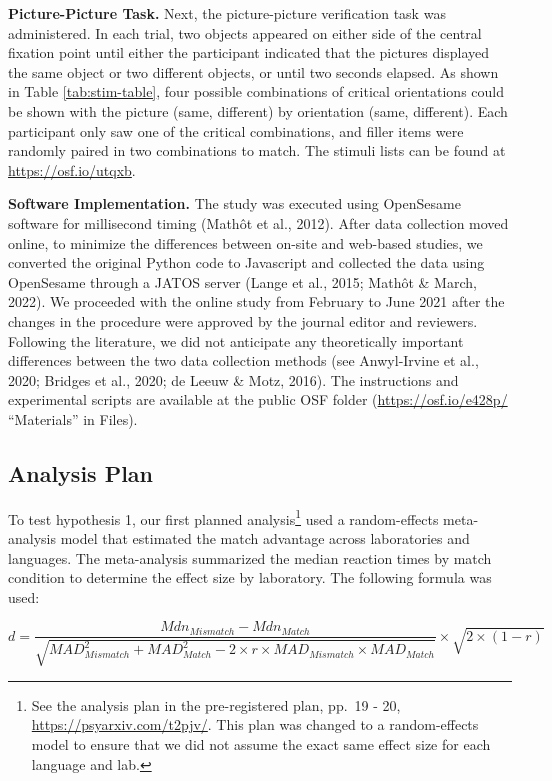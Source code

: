 \documentclass[
  man,floatsintext]{apa7}
\begin{document}
\textbf{Picture-Picture Task.} Next, the picture-picture verification task
was administered. In each trial, two objects appeared on either side of
the central fixation point until either the participant indicated that
the pictures displayed the same object or two different objects, or
until two seconds elapsed. As shown in Table \ref{tab:stim-table}, four
possible combinations of critical orientations could be shown with the
picture (same, different) by orientation (same, different). Each
participant only saw one of the critical combinations, and filler items
were randomly paired in two combinations to match. The stimuli lists can
be found at \url{https://osf.io/utqxb}.

\textbf{Software Implementation.} The study was executed using OpenSesame
software for millisecond timing
(Mathôt et al., 2012). After data collection moved
online, to minimize the differences between on-site and web-based
studies, we converted the original Python code to Javascript and
collected the data using OpenSesame through a JATOS server
(Lange et al., 2015; Mathôt \& March, 2022). We proceeded with
the online study from February to June 2021 after the changes in the
procedure were approved by the journal editor and reviewers. Following
the literature, we did not anticipate any theoretically important
differences between the two data collection methods (see Anwyl-Irvine et al., 2020; Bridges et al., 2020; de Leeuw \& Motz, 2016). The instructions and experimental
scripts are available at the public OSF folder (\url{https://osf.io/e428p/}
``Materials'' in Files).

\hypertarget{analysis-plan}{%
\subsection{Analysis Plan}\label{analysis-plan}}

To test hypothesis 1, our first planned analysis\footnote{See the analysis plan in the pre-registered plan, pp.~19 - 20,
  \url{https://psyarxiv.com/t2pjv/}. This plan was changed to a
  random-effects model to ensure that we did not assume the exact same
  effect size for each language and lab.} used a
random-effects meta-analysis model that estimated the match advantage
across laboratories and languages. The meta-analysis summarized the
median reaction times by match condition to determine the effect size by
laboratory. The following formula was used:

\[d = \frac{Mdn_{Mismatch} - Mdn_{Match}}{\sqrt{MAD_{Mismatch}^2 + MAD_{Match}^2-2\times r\times MAD_{Mismatch} \times MAD_{Match}}} \times \sqrt{2 \times (1-r)}\]
\end{document}
